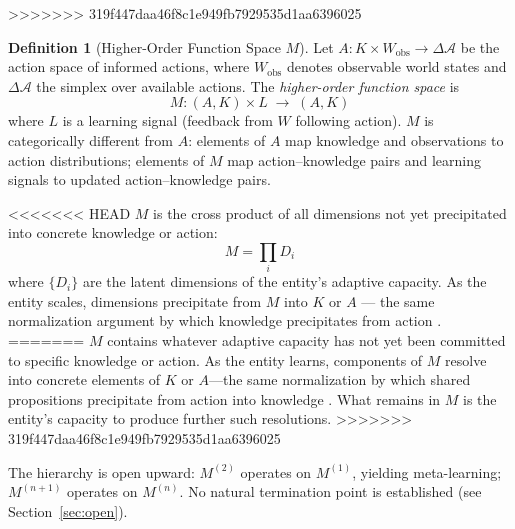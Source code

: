 \documentclass[11pt]{article}
\theoremstyle{definition}
\newtheorem{definition}{Definition}
\theoremstyle{remark}
\begin{document}
>>>>>>> 319f447daa46f8c1e949fb7929535d1aa6396025
\begin{definition}[Higher-Order Function Space $M$]
\label{def:M}
Let $A : K \times W_{\mathrm{obs}} \to \Delta \mathcal{A}$ be the
action space of informed actions, where $W_{\mathrm{obs}}$ denotes
observable world states and $\Delta \mathcal{A}$ the simplex over
available actions. The \emph{higher-order function space} is
\[
M : (A, K) \times L \;\to\; (A, K)
\]
where $L$ is a learning signal (feedback from $W$ following action).
$M$ is categorically different from $A$: elements of $A$ map knowledge
and observations to action distributions; elements of $M$ map
action--knowledge pairs and learning signals to updated
action--knowledge pairs.

<<<<<<< HEAD
$M$ is the cross product of all dimensions not yet precipitated into
concrete knowledge or action:
\[
M = \prod_{i} D_i
\]
where $\{D_i\}$ are the latent dimensions of the entity's adaptive
capacity. As the entity scales, dimensions precipitate from $M$ into $K$
or $A$ --- the same normalization argument by which knowledge
precipitates from action \cite{McCarthy2026c}.
=======
$M$ contains whatever adaptive capacity has not yet been committed to
specific knowledge or action. As the entity learns, components of $M$
resolve into concrete elements of $K$ or $A$---the same normalization
by which shared propositions precipitate from action into knowledge
\cite{McCarthy2026c}. What remains in $M$ is the entity's capacity
to produce further such resolutions.
>>>>>>> 319f447daa46f8c1e949fb7929535d1aa6396025

The hierarchy is open upward: $M^{(2)}$ operates on $M^{(1)}$, yielding
meta-learning; $M^{(n+1)}$ operates on $M^{(n)}$. No natural
termination point is established (see Section~\ref{sec:open}).
\end{definition}
\end{document}
